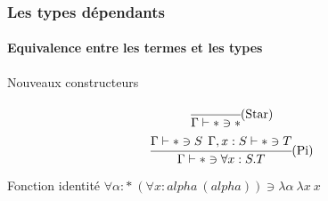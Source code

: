 \documentclass{beamer}
\newcommand{\Lam}[2]{\ensuremath{\lambda #1\: #2}}
\begin{document}
\begin{frame}
  \frametitle{Les types dépendants}
  \framesubtitle{Equivalence entre les termes et les types}

  \begin{block}{Nouveaux constructeurs}
    \[
    \begin{array}{cc}
    \cfrac{}
          {\Gamma \vdash * \ni *}\mbox{(Star)} 
          \medskip
          \\          
    \cfrac{\Gamma \vdash * \ni S\:\:\Gamma,x:S \vdash *\ni T}
          {\Gamma\vdash * \ni \forall x:S.T}\mbox{(Pi)}
    \end{array}
          \]
  \end{block}


  \begin{block}{Fonction identité}
    $\forall \alpha :*\:(\forall x:alpha\: (alpha)) \ni \Lam{\alpha}{\Lam{x}{x}}$
  \end{block}
  


\end{frame}
\end{document}
